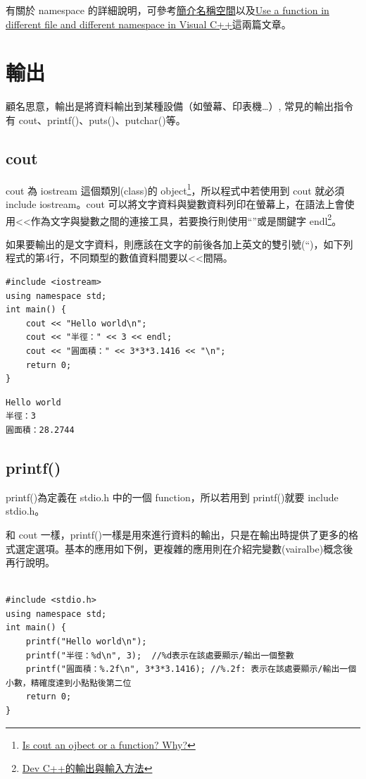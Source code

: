\documentclass[12pt,a4paper]{article}
\begin{document}
有關於 namespace 的詳細說明，可參考\href{https://openhome.cc/Gossip/CppGossip/Namespace.html}{簡介名稱空間}以及\href{https://stackoverflow.com/questions/37693999/use-a-function-in-different-file-and-different-namespace-in-visual-c}{Use a function in different file and different namespace in Visual C++}這兩篇文章。

\section{輸出}
\label{cpp_output}
顧名思意，輸出是將資料輸出到某種設備（如螢幕、印表機\ldots{}）, 常見的輸出指令有 cout、printf()、puts()、putchar()等。
\subsection{cout}
\label{sec:org3526fc2}
cout 為 iostream 這個類別(class)的 object\footnote{\href{https://www.quora.com/Is-cout-an-object-or-a-function-Why}{Is cout an ojbect or a function? Why?}}，所以程式中若使用到 cout 就必須 include iostream。cout 可以將文字資料與變數資料列印在螢幕上，在語法上會使用<<作為文字與變數之間的連接工具，若要換行則使用``\n''或是關鍵字 endl\footnote{\href{http://rs2.ocu.edu.tw/\~jengchi/IO\_instruction.htm}{Dev C++的輸出與輸入方法}}。

如果要輸出的是文字資料，則應該在文字的前後各加上英文的雙引號(``)，如下列程式的第4行，不同類型的數值資料間要以<<間隔。

\lstset{breaklines=true,language=cpp,label= ,caption= ,captionpos=b,firstnumber=1,numbers=left}
\begin{lstlisting}
#include <iostream>
using namespace std;
int main() {
    cout << "Hello world\n";
    cout << "半徑：" << 3 << endl;
    cout << "圓面積：" << 3*3*3.1416 << "\n";
    return 0;
}
\end{lstlisting}

\begin{verbatim}
Hello world
半徑：3
圓面積：28.2744
\end{verbatim}

\subsection{printf()}
\label{cpp_printf}
printf()為定義在 stdio.h 中的一個 function，所以若用到 printf()就要 include stdio.h。

和 cout 一樣，printf()一樣是用來進行資料的輸出，只是在輸出時提供了更多的格式選定選項。基本的應用如下例，更複雜的應用則在介紹完變數(vairalbe)概念後再行說明。
\lstset{breaklines=true,language=cpp,label= ,caption= ,captionpos=b,firstnumber=1,numbers=left}
\begin{lstlisting}

#include <stdio.h>
using namespace std;
int main() {
    printf("Hello world\n");
    printf("半徑：%d\n", 3);  //%d表示在該處要顯示/輸出一個整數
    printf("圓面積：%.2f\n", 3*3*3.1416); //%.2f: 表示在該處要顯示/輸出一個小數，精確度達到小點點後第二位
    return 0;
}
\end{lstlisting}
\end{document}
